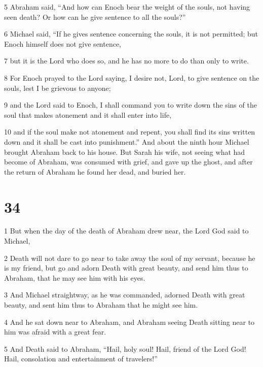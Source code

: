 \par 5 Abraham said, “And how can Enoch bear the weight of the souls, not having seen death? Or how can he give sentence to all the souls?” 

\par 6 Michael said, “If he gives sentence concerning the souls, it is not permitted; but Enoch himself does not give sentence, 

\par 7 but it is the Lord who does so, and he has no more to do than only to write. 

\par 8 For Enoch prayed to the Lord saying, I desire not, Lord, to give sentence on the souls, lest I be grievous to anyone; 

\par 9 and the Lord said to Enoch, I shall command you to write down the sins of the soul that makes atonement and it shall enter into life, 

\par 10 and if the soul make not atonement and repent, you shall find its sins written down and it shall be cast into punishment.” And about the ninth hour Michael brought Abraham back to his house. But Sarah his wife, not seeing what had become of Abraham, was consumed with grief, and gave up the ghost, and after the return of Abraham he found her dead, and buried her.

\chapter{34}

\par 1 But when the day of the death of Abraham drew near, the Lord God said to Michael, 

\par 2 Death will not dare to go near to take away the soul of my servant, because he is my friend, but go and adorn Death with great beauty, and send him thus to Abraham, that he may see him with his eyes. 

\par 3 And Michael straightway, as he was commanded, adorned Death with great beauty, and sent him thus to Abraham that he might see him. 

\par 4 And he sat down near to Abraham, and Abraham seeing Death sitting near to him was afraid with a great fear. 

\par 5 And Death said to Abraham, “Hail, holy soul! Hail, friend of the Lord God! Hail, consolation and entertainment of travelers!” 

